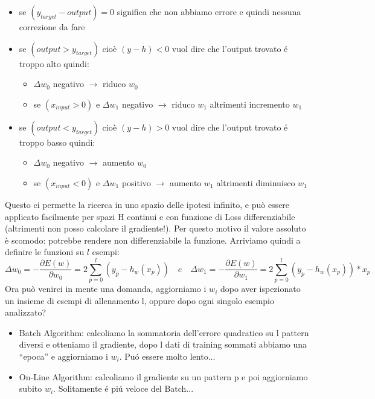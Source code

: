 \documentclass{article}
\begin{document}
\begin{itemize}
    \item se $(y_{target}-output)=0$ significa che non abbiamo errore e quindi nessuna correzione da fare
    \item se $(output>y_{target})$ cioè $(y-h)<0$ vuol dire che l'output trovato é troppo alto quindi:
        \begin{itemize}
            \item $\Delta w_0$ negativo $\rightarrow$ riduco $w_0$
            \item se $(x_{input}>0)$ e $\Delta w_1$ negativo $\rightarrow$ riduco $w_1$ altrimenti incremento $w_1$
        \end{itemize}
    \item se $(output<y_{target})$ cioè $(y-h)>0$ vuol dire che l'output trovato é troppo basso quindi: %
        \begin{itemize}
            \item $\Delta w_0$ negativo $\rightarrow$ aumento $w_0$
            \item se $(x_{input}<0)$ e $\Delta w_1$ positivo $\rightarrow$ aumento $w_1$ altrimenti diminuisco $w_1$
        \end{itemize}
\end{itemize}
Questo ci permette la ricerca in uno spazio delle ipotesi infinito, e può essere applicato facilmente per spazi H continui e con funzione di Loss differenziabile (altrimenti non posso calcolare il gradiente!). Per questo motivo il valore assoluto è scomodo: potrebbe rendere non differenziabile la funzione. \newline
Arriviamo quindi a definire le funzioni su $l$  esempi:
\begin{equation}
    \Delta w_0 = - \frac{\partial E(w)}{\partial w_0} = 2 \sum_{p=0}^l (y_p - h_w(x_p)) \quad e \quad \Delta w_1 = - \frac{\partial E(w)}{\partial w_1} = 2 \sum_{p=0}^l (y_p - h_w(x_p)) * x_p
\end{equation}
Ora può venirci in mente una domanda, aggiorniamo i $w_i$ dopo aver ispezionato un insieme di esempi di allenamento l, oppure dopo ogni singolo esempio analizzato?
\begin{itemize}
    \item Batch Algorithm: calcoliamo la sommatoria dell'errore quadratico su l pattern diversi e otteniamo il gradiente, dopo l dati di training sommati abbiamo una “epoca” e aggiorniamo i $w_i$. Puó essere molto lento...
    \item On-Line Algorithm: calcoliamo il gradiente su un pattern p e poi aggiorniamo subito $w_i$. Solitamente é piú veloce del Batch...
\end{itemize}
\end{document}
